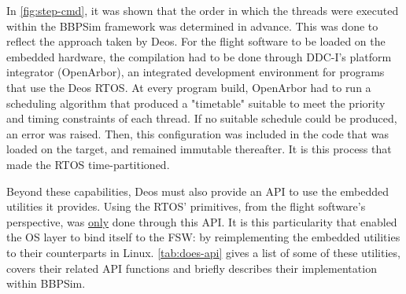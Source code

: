 {In \autoref{fig:step-cmd}, it was shown that the order in which the threads were executed within the \gls{BBPSim} framework was determined in advance. This was done to reflect the approach taken by Deos. For the flight software to be loaded on the embedded hardware, the compilation had to be done through DDC-I's platform integrator (OpenArbor), an integrated development environment for programs that use the Deos RTOS. At every program build, OpenArbor had to run a scheduling algorithm that produced a "timetable" suitable to meet the priority and timing constraints of each thread. If no suitable schedule could be produced, an error was raised. Then, this configuration was included in the code that was loaded on the target, and remained immutable thereafter. It is this process that made the RTOS time-partitioned.

Beyond these capabilities, Deos must also provide an API to use the embedded utilities it provides. Using the RTOS' primitives, from the flight software's perspective, was \ul{only} done through this API. It is this particularity that enabled the OS layer to bind itself to the FSW: by reimplementing the embedded utilities to their counterparts in Linux. \autoref{tab:does-api} gives a list of some of these utilities, covers their related API functions and briefly describes their implementation within \gls{BBPSim}. 

}
